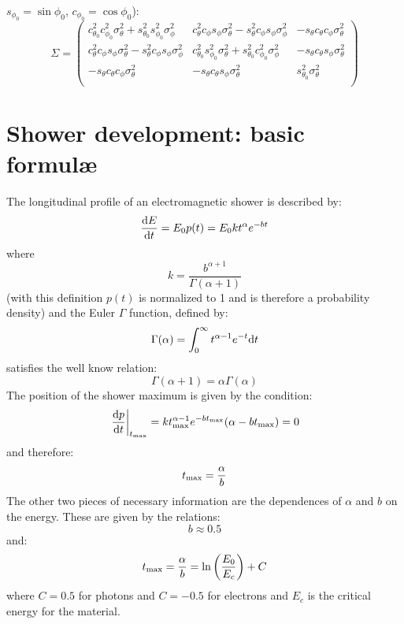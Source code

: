 \documentclass[a4paper,11pt]{article}
\newcommand{\firstder}[2]{\frac{{\rm d}#1}{{\rm d}#2}}
\newcommand{\tmax}{t_{\rm max}}
\newcommand{\diff}{{\rm d}}
\begin{document}
$s_{\phi_0} = \sin\phi_0$, $c_{\phi_0} = \cos\phi_0$):
\begin{equation}
  \Sigma =
  \begin{pmatrix}
    c_{\theta_0}^2c_{\phi_0}^2\sigma^2_\theta +
    s_{\theta_0}^2s_{\phi_0}^2\sigma^2_\phi
    & c_{\theta}^2 c_{\phi}s_{\phi}\sigma^2_\theta -
    s_{\theta}^2c_{\phi}s_{\phi}\sigma^2_\phi
    & -s_{\theta}c_{\theta}c_{\phi} \sigma^2_\theta\\
    c_{\theta}^2 c_{\phi}s_{\phi}\sigma^2_\theta -
    s_{\theta}^2c_{\phi}s_{\phi}\sigma^2_\phi
    & c_{\theta_0}^2s_{\phi_0}^2\sigma^2_\theta +
    s_{\theta_0}^2c_{\phi_0}^2\sigma^2_\phi
    & -s_{\theta}c_{\theta}s_{\phi} \sigma^2_\theta\\
    -s_{\theta}c_{\theta}c_{\phi} \sigma^2_\theta
    & -s_{\theta}c_{\theta}s_{\phi} \sigma^2_\theta
    & s_{\theta_0}^2\sigma^2_\theta\\
  \end{pmatrix}
\end{equation}


\section{Shower development: basic formul\ae}

The longitudinal profile of an electromagnetic shower is described by:
\begin{equation}
\firstder{E}{t} = E_0 p(t) = E_0 k t^\alpha e^{-bt}
\end{equation}
where
$$
k = \frac{b^{\alpha + 1}}{\Gamma(\alpha + 1)}
$$
(with this definition $p(t)$ is normalized to 1 and is therefore a probability
density) and the Euler $\Gamma$ function, defined by:
$$
\Gamma(\alpha) = \int_{0}^\infty t^{\alpha - 1} e^{-t} \diff t
$$
satisfies the well know relation:
$$
\Gamma(\alpha + 1) = \alpha \Gamma(\alpha)
$$
The position of the shower maximum is given by the condition:
$$
\left.\firstder{p}{t}\right|_{\tmax} =
k \tmax^{\alpha - 1} e^{-b\tmax} (\alpha  - b\tmax) = 0
$$
and therefore:
\begin{equation}
\tmax = \frac{\alpha}{b}
\end{equation}
The other two pieces of necessary information are the dependences of $\alpha$
and $b$ on the energy. These are given by the relations:
\begin{equation}
b \approx 0.5
\end{equation}
and:
\begin{equation}
\tmax = \frac{\alpha}{b} = \ln\left(\frac{E_0}{E_c}\right) + C
\end{equation}
where $C=0.5$ for photons and $C=-0.5$ for electrons and $E_c$ is the critical
energy for the material.
\end{document}
